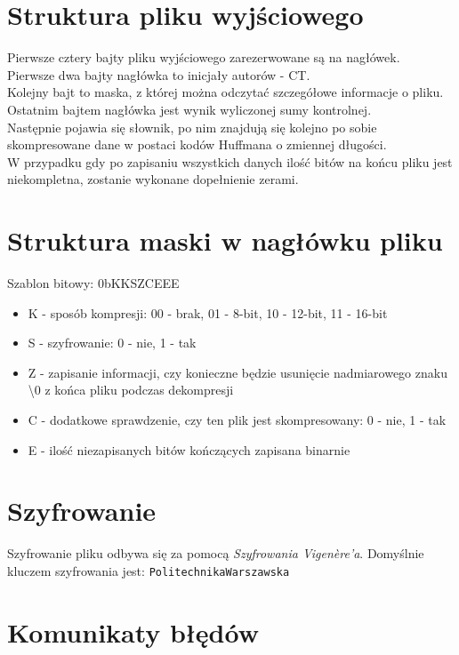 \documentclass[]{article}
\begin{document}
\section{Struktura pliku wyjściowego}\label{header-n279}
Pierwsze cztery bajty pliku wyjściowego zarezerwowane są na nagłówek. \\
Pierwsze dwa bajty nagłówka to inicjały autorów - CT.\\
Kolejny bajt to maska, z której można odczytać szczegółowe informacje o pliku. Ostatnim bajtem nagłówka jest wynik wyliczonej sumy kontrolnej.\\
Następnie pojawia się słownik, po nim znajdują się kolejno po sobie skompresowane dane w postaci kodów Huffmana o zmiennej długości.\\
W przypadku gdy po zapisaniu wszystkich danych ilość bitów na końcu pliku jest niekompletna, zostanie wykonane dopełnienie zerami.
\section{Struktura maski w nagłówku pliku}\label{header-n279}

    Szablon bitowy: 0bKKSZCEEE
\begin{itemize}
    \item K - sposób kompresji: 00 - brak, 01 - 8-bit, 10 - 12-bit, 11 - 16-bit
   \item  S - szyfrowanie: 0 - nie, 1 - tak
   \item  Z - zapisanie informacji, czy konieczne będzie usunięcie nadmiarowego znaku \textbackslash0 z końca pliku podczas dekompresji
   \item  C - dodatkowe sprawdzenie, czy ten plik jest skompresowany: 0 - nie, 1 - tak
   \item  E - ilość niezapisanych bitów kończących zapisana binarnie
\end{itemize}
 \section{Szyfrowanie}\label{header-n281} 
Szyfrowanie pliku odbywa się za pomocą \emph{Szyfrowania Vigenère’a}. Domyślnie kluczem szyfrowania jest: 
\texttt{Politechnika\textunderscore Warszawska}

\section{Komunikaty błędów}\label{header-n281}
\end{document}
